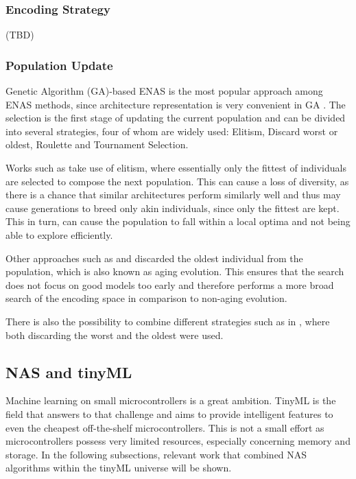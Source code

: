 \documentclass[10pt,        %
               a4paper,     %
               journal,     %
               ]{IEEEtran}
\begin{document}
\subsubsection{Encoding Strategy} (TBD)

\subsubsection{Population Update}
Genetic Algorithm (GA)-based ENAS is the most popular approach among ENAS methods, since architecture representation is
very convenient in GA \cite{liu2021survey}. The selection is the first stage of updating the current population and can
be divided into several strategies, four of whom are widely used: Elitism, Discard worst or oldest, Roulette and Tournament
Selection.

Works such as \cite{elsken2017simple} take use of elitism, where essentially only the fittest of individuals are selected to
compose the next population. This can cause a loss of diversity, as there is a chance that similar architectures perform
similarly well and thus may cause generations to breed only akin individuals, since only the fittest are kept. This in turn,
can cause the population to fall within a local optima and not being able to explore efficiently.

Other approaches such as \cite{pmlr-v70-real17a} and \cite{zhang2019identify} discarded the oldest individual from the population,
which is also known as aging evolution. This ensures that the search does not focus on good models too early and therefore
performs a more broad search of the encoding space in comparison to non-aging evolution.

There is also the possibility to combine different strategies such as in \cite{zhu2019eena}, where both discarding the worst and the oldest
were used.

\subsection{NAS and tinyML}
\label{nasml}
Machine learning on small microcontrollers is a great ambition. TinyML is the field that answers to that challenge
and aims to provide intelligent features to even the cheapest off-the-shelf microcontrollers. This is not a
small effort as microcontrollers possess very limited resources, especially concerning memory and storage. In the following
subsections, relevant work that combined NAS algorithms within the tinyML universe will be shown.
\end{document}
